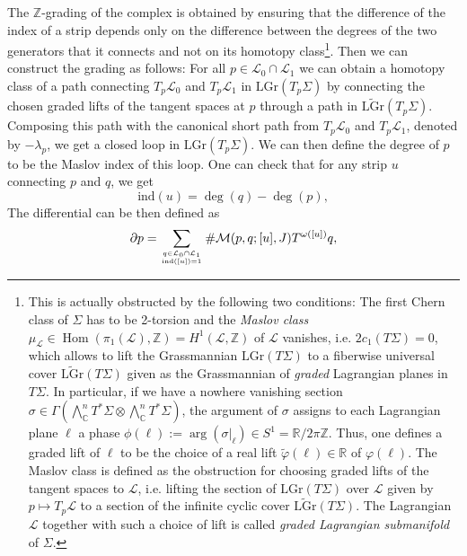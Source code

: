 \documentclass[11pt,colorinlistoftodos]{amsart}
\numberwithin{equation}{subsection}
\theoremstyle{plain}
\theoremstyle{definition}
\theoremstyle{remark}
\newcommand{\R}{\mathbb{R}}
\newcommand{\Z}{\mathbb{Z}}
\newcommand{\C}{\mathbb{C}}
\DeclareMathOperator{\Hom}{Hom}
\newcommand{\de}{\partial}
\newcommand{\calL}{\mathcal{L}}
\newcommand{\calM}{\mathcal{M}}
\begin{document}
The $\Z$-grading of the complex is obtained by ensuring that the difference of the index of a strip depends only on the difference between the degrees of the two generators that it connects and not on its homotopy class\footnote{This is actually obstructed by the following two conditions: The first Chern class of $\Sigma$ has to be 2-torsion and the \emph{Maslov class} $\mu_\calL\in \Hom(\pi_1(\calL),\Z)=H^1(\calL,\Z)$ of $\calL$ vanishes, i.e. $2c_1(T\Sigma)=0$, which allows to lift the Grassmannian $\mathrm{LGr}(T\Sigma)$ to a fiberwise universal cover $\widetilde{\mathrm{LGr}}(T\Sigma)$ given as the Grassmannian of \emph{graded} Lagrangian planes in $T\Sigma$. In particular, if we have a nowhere vanishing section $\sigma\in \Gamma(\bigwedge^n_\C T^*\Sigma\otimes \bigwedge^n_\C T^*\Sigma)$, the argument of $\sigma$ assigns to each Lagrangian plane $\ell$ a phase $\phi(\ell):=\arg(\sigma\vert_\ell)\in S^1=\R/2\pi\Z$. Thus, one defines a graded lift of $\ell$ to be the choice of a real lift $\tilde{\varphi}(\ell)\in\R$ of $\varphi(\ell)$.
The Maslov class is defined as the obstruction for choosing graded lifts of the tangent spaces to $\calL$, i.e. lifting the section of $\mathrm{LGr}(T\Sigma)$ over $\calL$ given by $p\mapsto T_p\calL$ to a section of the infinite cyclic cover $\widetilde{\mathrm{LGr}}(T\Sigma)$. The Lagrangian $\calL$ together with such a choice of lift is called \emph{graded Lagrangian submanifold} of $\Sigma$.}. Then we can construct the grading as follows: For all $p\in\calL_0\cap\calL_1$ we can obtain a homotopy class of a path connecting $T_p\calL_0$ and $T_p\calL_1$ in $\mathrm{LGr}(T_p\Sigma)$ by connecting the chosen graded lifts of the tangent spaces at $p$ through a path in $\widetilde{\mathrm{LGr}}(T_p\Sigma)$. Composing this path with the canonical short path from $T_p\calL_0$ and $T_p\calL_1$, denoted by $-\lambda_p$, we get a closed loop in $\mathrm{LGr}(T_p\Sigma)$. We can then define the degree of $p$ to be the Maslov index of this loop. One can check that for any strip $u$ connecting $p$ and $q$, we get 
\[
\mathrm{ind}(u)=\deg(q)-\deg(p),
\]
The differential can be then defined as 
\[
\de p=\sum_{q\in\calL_0\cap\calL_1\atop \mathrm{ind}([u])=1}\#\calM(p,q;[u],J) T^{\omega([u])}q,
\]
\end{document}
